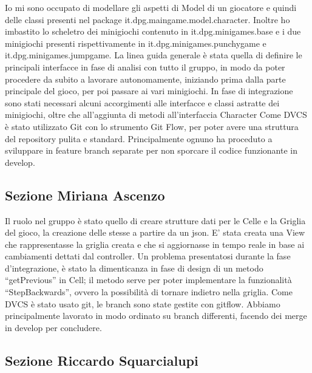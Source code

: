 \documentclass[a4paper,12pt]{report}
\begin{document}
    Io mi sono occupato di modellare gli aspetti di Model di un giocatore e quindi delle classi presenti nel package it.dpg.maingame.model.character.\newline
    Inoltre ho imbastito lo scheletro dei minigiochi contenuto in it.dpg.minigames.base e i due minigiochi presenti rispettivamente in it.dpg.minigames.punchygame e it.dpg.minigames.jumpgame.\newline
    La linea guida generale è stata quella di definire le principali interfacce in fase di analisi con tutto il gruppo, in modo da poter procedere da subito a lavorare autonomamente,
    iniziando prima dalla parte principale del gioco, per poi passare ai vari minigiochi.\newline
    In fase di integrazione sono stati necessari alcuni accorgimenti alle interfacce e classi astratte dei minigiochi, oltre che all'aggiunta di metodi all'interfaccia Character\newline
    Come DVCS è stato utilizzato Git con lo strumento Git Flow, per poter avere una struttura del repository pulita e standard.
    Principalmente ognuno ha proceduto a sviluppare in feature branch separate per non sporcare il codice funzionante in develop.

	\subsection{Sezione Miriana Ascenzo}

	Il ruolo nel gruppo è stato quello di creare strutture dati per le Celle e la Griglia del gioco, la creazione delle stesse a partire da un json.
    E' stata creata una View che rappresentasse la griglia creata e che si aggiornasse in tempo reale in base ai cambiamenti dettati dal controller.
	Un problema presentatosi durante la fase d’integrazione, è stato la dimenticanza in fase di design di un metodo “getPrevious” in Cell;
    il metodo serve per poter implementare la funzionalità “StepBackwards”, ovvero la possibilità di tornare indietro nella griglia.
    Come DVCS è stato usato git, le branch sono state gestite con gitflow.
    Abbiamo principalmente lavorato in modo ordinato su branch differenti, facendo dei merge in develop per concludere.

	\subsection{Sezione Riccardo Squarcialupi}
	
\end{document}

